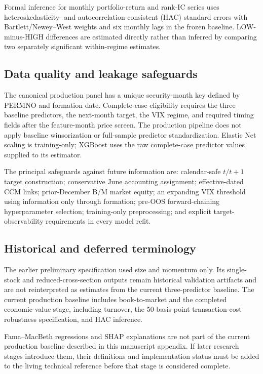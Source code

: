Formal inference for monthly portfolio-return and rank-IC series uses heteroskedasticity- and autocorrelation-consistent (HAC) standard errors with Bartlett/Newey--West weights and six monthly lags in the frozen baseline. LOW-minus-HIGH differences are estimated directly rather than inferred by comparing two separately significant within-regime estimates.

\subsection{Data quality and leakage safeguards}

The canonical production panel has a unique security-month key defined by PERMNO and formation date. Complete-case eligibility requires the three baseline predictors, the next-month target, the VIX regime, and required timing fields after the feature-month price screen. The production pipeline does not apply baseline winsorization or full-sample predictor standardization. Elastic Net scaling is training-only; XGBoost uses the raw complete-case predictor values supplied to its estimator.

The principal safeguards against future information are: calendar-safe $t/t+1$ target construction; conservative June accounting assignment; effective-dated CCM links; prior-December B/M market equity; an expanding VIX threshold using information only through formation; pre-OOS forward-chaining hyperparameter selection; training-only preprocessing; and explicit target-observability requirements in every model refit.

\subsection{Historical and deferred terminology}

The earlier preliminary specification used size and momentum only. Its single-stock and reduced-cross-section outputs remain historical validation artifacts and are not reinterpreted as estimates from the current three-predictor baseline. The current production baseline includes book-to-market and the completed economic-value stage, including turnover, the 50-basis-point transaction-cost robustness specification, and HAC inference.

Fama--MacBeth regressions and SHAP explanations are not part of the current production baseline described in this manuscript appendix. If later research stages introduce them, their definitions and implementation status must be added to the living technical reference before that stage is considered complete.
